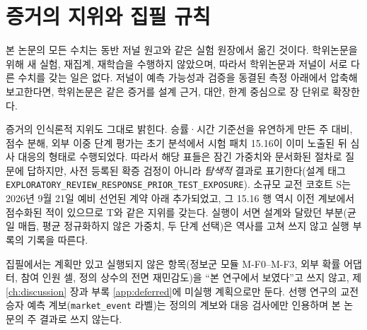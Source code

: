 \section{증거의 지위와 집필 규칙}
\label{sec:intro-epistemic}

본 논문의 모든 수치는 동반 저널 원고와 같은 실험 원장에서 옮긴 것이다. 학위논문을 위해 새 실험, 재집계, 재학습을 수행하지 않았으며, 따라서 학위논문과 저널이 서로 다른 수치를 갖는 일은 없다. 저널이 예측 가능성과 검증을 동결된 측정 아래에서 압축해 보고한다면, 학위논문은 같은 증거를 설계 근거, 대안, 한계 중심으로 장 단위로 확장한다.

증거의 인식론적 지위도 그대로 밝힌다. 승률·시간 기준선을 유연하게 만든 주 대비, 점수 분해, 외부 이중 단계 평가는 초기 분석에서 시험 패치 15.16이 이미 노출된 뒤 심사 대응의 형태로 수행되었다. 따라서 해당 표들은 잠긴 가중치와 문서화된 절차로 질문에 답하지만, 사전 등록된 확증 검정이 아니라 \emph{탐색적} 결과로 표기한다(설계 태그 \texttt{EXPLORATORY\_REVIEW\_RESPONSE\_PRIOR\_TEST\_EXPOSURE}). 소규모 교전 코호트 S는 2026년 9월 21일 예비 선언된 계약 아래 추가되었고, 그 15.16 행 역시 이전 계보에서 점수화된 적이 있으므로 T와 같은 지위를 갖는다. 실행이 서면 설계와 달랐던 부분(균일 매듭, 평균 정규화하지 않은 가중치, 두 단계 선택)은 역사를 고쳐 쓰지 않고 실행 부록의 기록을 따른다.

집필에서는 계획만 있고 실행되지 않은 항목(정보군 모듈 M-F0--M-F3, 외부 확률 어댑터, 참여 인원 셀, 정의 상수의 전면 재민감도)을 ``본 연구에서 보였다''고 쓰지 않고, 제 \ref{ch:discussion} 장과 부록 \ref{app:deferred}에 미실행 계획으로만 둔다. 선행 연구의 교전 승자 예측 계보(\texttt{market\_event} 라벨)는 정의의 계보와 대응 검사에만 인용하며 본 논문의 주 결과로 쓰지 않는다.
